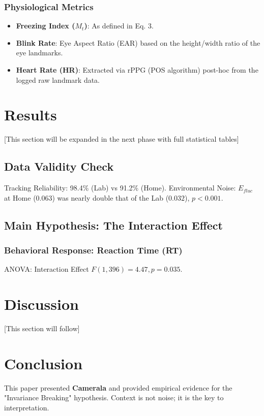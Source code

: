 \documentclass[journal]{IEEEtran}
\begin{document}
\subsubsection{Physiological Metrics}
\begin{itemize}
    \item \textbf{Freezing Index ($M_t$)}: As defined in Eq. 3.
    \item \textbf{Blink Rate}: Eye Aspect Ratio (EAR) based on the height/width ratio of the eye landmarks.
    \item \textbf{Heart Rate (HR)}: Extracted via rPPG (POS algorithm) post-hoc from the logged raw landmark data.
\end{itemize}

\section{Results}
[This section will be expanded in the next phase with full statistical tables]
\subsection{Data Validity Check}
Tracking Reliability: 98.4\% (Lab) vs 91.2\% (Home).
Environmental Noise: $E_{fluc}$ at Home ($0.063$) was nearly double that of the Lab ($0.032$), $p < 0.001$.

\subsection{Main Hypothesis: The Interaction Effect}
\subsubsection{Behavioral Response: Reaction Time (RT)}
ANOVA: Interaction Effect $F(1, 396) = 4.47, p = 0.035$.

\section{Discussion}
[This section will follow]

\section{Conclusion}
This paper presented \textbf{Camerala} and provided empirical evidence for the "Invariance Breaking" hypothesis. Context is not noise; it is the key to interpretation.



\end{document}
